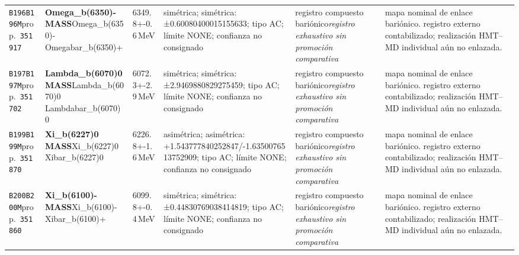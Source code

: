 \begin{landscape}
\begin{longtable}{L{1.85cm}L{4.45cm}L{2.35cm}L{4.05cm}L{3.35cm}L{7.15cm}}
\texttt{B196}\newline \texttt{B196M}\newline prop.\ \texttt{351917} & \textbf{Omega\_\allowbreak{}b(6350)- MASS}\newline Omega\_\allowbreak{}b(6350)- \textbar{}\allowbreak{} Omegabar\_\allowbreak{}b(6350)+ & 6349.8+-0.6\,MeV & simétrica; simétrica: ±0.60080400015155633; tipo AC; límite NONE; confianza no consignado & registro compuesto bariónico\newline \emph{registro exhaustivo sin promoción comparativa} & mapa nominal de enlace bariónico. registro externo contabilizado; realización HMT--MD individual aún no enlazada. \\
\texttt{B197}\newline \texttt{B197M}\newline prop.\ \texttt{351702} & \textbf{Lambda\_\allowbreak{}b(6070)0 MASS}\newline Lambda\_\allowbreak{}b(6070)0 \textbar{}\allowbreak{} Lambdabar\_\allowbreak{}b(6070)0 & 6072.3+-2.9\,MeV & simétrica; simétrica: ±2.9469880829275459; tipo AC; límite NONE; confianza no consignado & registro compuesto bariónico\newline \emph{registro exhaustivo sin promoción comparativa} & mapa nominal de enlace bariónico. registro externo contabilizado; realización HMT--MD individual aún no enlazada. \\
\texttt{B199}\newline \texttt{B199M}\newline prop.\ \texttt{351870} & \textbf{Xi\_\allowbreak{}b(6227)0 MASS}\newline Xi\_\allowbreak{}b(6227)0 \textbar{}\allowbreak{} Xibar\_\allowbreak{}b(6227)0 & 6226.8+-1.6\,MeV & asimétrica; asimétrica: +1.543777840252847/-1.6350076513752909; tipo AC; límite NONE; confianza no consignado & registro compuesto bariónico\newline \emph{registro exhaustivo sin promoción comparativa} & mapa nominal de enlace bariónico. registro externo contabilizado; realización HMT--MD individual aún no enlazada. \\
\texttt{B200}\newline \texttt{B200M}\newline prop.\ \texttt{351860} & \textbf{Xi\_\allowbreak{}b(6100)- MASS}\newline Xi\_\allowbreak{}b(6100)- \textbar{}\allowbreak{} Xibar\_\allowbreak{}b(6100)+ & 6099.8+-0.4\,MeV & simétrica; simétrica: ±0.44830769038414819; tipo AC; límite NONE; confianza no consignado & registro compuesto bariónico\newline \emph{registro exhaustivo sin promoción comparativa} & mapa nominal de enlace bariónico. registro externo contabilizado; realización HMT--MD individual aún no enlazada. \\

\end{longtable}
\end{landscape}
